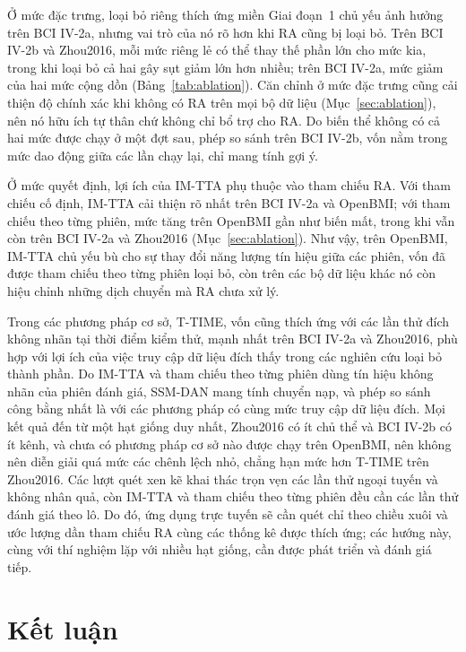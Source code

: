 \documentclass[preprint,12pt]{elsarticle}
\begin{document}
Ở mức đặc trưng, loại bỏ riêng thích ứng miền Giai đoạn~1 chủ yếu ảnh hưởng trên BCI IV-2a, nhưng vai trò của nó rõ hơn khi RA cũng bị loại bỏ. Trên BCI IV-2b và Zhou2016, mỗi mức riêng lẻ có thể thay thế phần lớn cho mức kia, trong khi loại bỏ cả hai gây sụt giảm lớn hơn nhiều; trên BCI IV-2a, mức giảm của hai mức cộng dồn (Bảng~\ref{tab:ablation}). Căn chỉnh ở mức đặc trưng cũng cải thiện độ chính xác khi không có RA trên mọi bộ dữ liệu (Mục~\ref{sec:ablation}), nên nó hữu ích tự thân chứ không chỉ bổ trợ cho RA. Do biến thể không có cả hai mức được chạy ở một đợt sau, phép so sánh trên BCI IV-2b, vốn nằm trong mức dao động giữa các lần chạy lại, chỉ mang tính gợi ý.

Ở mức quyết định, lợi ích của IM-TTA phụ thuộc vào tham chiếu RA. Với tham chiếu cố định, IM-TTA cải thiện rõ nhất trên BCI IV-2a và OpenBMI; với tham chiếu theo từng phiên, mức tăng trên OpenBMI gần như biến mất, trong khi vẫn còn trên BCI IV-2a và Zhou2016 (Mục~\ref{sec:ablation}). Như vậy, trên OpenBMI, IM-TTA chủ yếu bù cho sự thay đổi năng lượng tín hiệu giữa các phiên, vốn đã được tham chiếu theo từng phiên loại bỏ, còn trên các bộ dữ liệu khác nó còn hiệu chỉnh những dịch chuyển mà RA chưa xử lý.

Trong các phương pháp cơ sở, T-TIME, vốn cũng thích ứng với các lần thử đích không nhãn tại thời điểm kiểm thử, mạnh nhất trên BCI IV-2a và Zhou2016, phù hợp với lợi ích của việc truy cập dữ liệu đích thấy trong các nghiên cứu loại bỏ thành phần. Do IM-TTA và tham chiếu theo từng phiên dùng tín hiệu không nhãn của phiên đánh giá, SSM-DAN mang tính chuyển nạp, và phép so sánh công bằng nhất là với các phương pháp có cùng mức truy cập dữ liệu đích. Mọi kết quả đến từ một hạt giống duy nhất, Zhou2016 có ít chủ thể và BCI IV-2b có ít kênh, và chưa có phương pháp cơ sở nào được chạy trên OpenBMI, nên không nên diễn giải quá mức các chênh lệch nhỏ, chẳng hạn mức hơn T-TIME trên Zhou2016. Các lượt quét xen kẽ khai thác trọn vẹn các lần thử ngoại tuyến và không nhân quả, còn IM-TTA và tham chiếu theo từng phiên đều cần các lần thử đánh giá theo lô. Do đó, ứng dụng trực tuyến sẽ cần quét chỉ theo chiều xuôi và ước lượng dần tham chiếu RA cùng các thống kê được thích ứng; các hướng này, cùng với thí nghiệm lặp với nhiều hạt giống, cần được phát triển và đánh giá tiếp.

\section{Kết luận}
\label{sec:conclusion}
\end{document}
